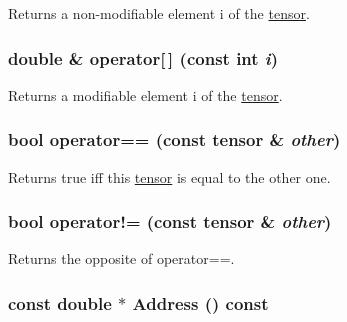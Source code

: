 Returns a non-\/modifiable element i of the \hyperlink{classJKBuilder_1_1tensor}{tensor}. \hypertarget{classJKBuilder_1_1tensor_a38c9fed6b117f7cf8b76785648d76b62}{
\subsubsection[{operator[]}]{\setlength{\rightskip}{0pt plus 5cm}double \& operator\mbox{[}$\,$\mbox{]} (const int {\em i})}}
\label{classJKBuilder_1_1tensor_a38c9fed6b117f7cf8b76785648d76b62}


Returns a modifiable element i of the \hyperlink{classJKBuilder_1_1tensor}{tensor}. \hypertarget{classJKBuilder_1_1tensor_a10ae0b61e655854d12c6465d2b9e3506}{
\subsubsection[{operator==}]{\setlength{\rightskip}{0pt plus 5cm}bool operator== (const {\bf tensor} \& {\em other})}}
\label{classJKBuilder_1_1tensor_a10ae0b61e655854d12c6465d2b9e3506}


Returns true iff this \hyperlink{classJKBuilder_1_1tensor}{tensor} is equal to the other one. \hypertarget{classJKBuilder_1_1tensor_a9b42dd835ddf2eb1a26b5d525b59b2b8}{
\subsubsection[{operator!=}]{\setlength{\rightskip}{0pt plus 5cm}bool operator!= (const {\bf tensor} \& {\em other})}}
\label{classJKBuilder_1_1tensor_a9b42dd835ddf2eb1a26b5d525b59b2b8}


Returns the opposite of operator==. \hypertarget{classJKBuilder_1_1tensor_a6a4e024f566d3bf9ba32a349afc5bbcf}{
\subsubsection[{Address}]{\setlength{\rightskip}{0pt plus 5cm}const double $\ast$ Address () const}}
\label{classJKBuilder_1_1tensor_a6a4e024f566d3bf9ba32a349afc5bbcf}


